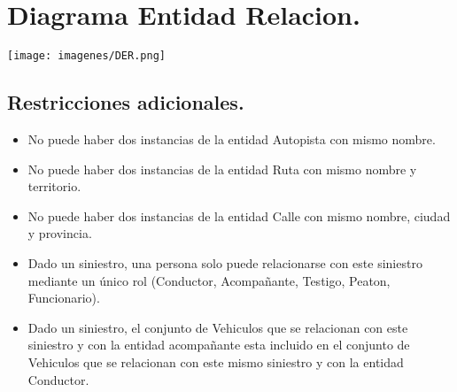 \section{Diagrama Entidad Relacion.}
\texttt{[image: imagenes/DER.png]}

\subsection{Restricciones adicionales.}
\begin{itemize}
	\item No puede haber dos instancias de la entidad Autopista con mismo nombre.
	\item No puede haber dos instancias de la entidad Ruta con mismo nombre y territorio.
	\item No puede haber dos instancias de la entidad Calle con mismo nombre, ciudad y provincia.
	\item Dado un siniestro, una persona solo puede relacionarse con este siniestro mediante un único rol (Conductor, Acompañante, Testigo, Peaton, Funcionario).
	\item Dado un siniestro, el conjunto de Vehiculos que se relacionan con este siniestro y con la entidad acompañante esta incluido en el conjunto de Vehiculos que se relacionan con este mismo siniestro y con la entidad Conductor.
\end{itemize}



